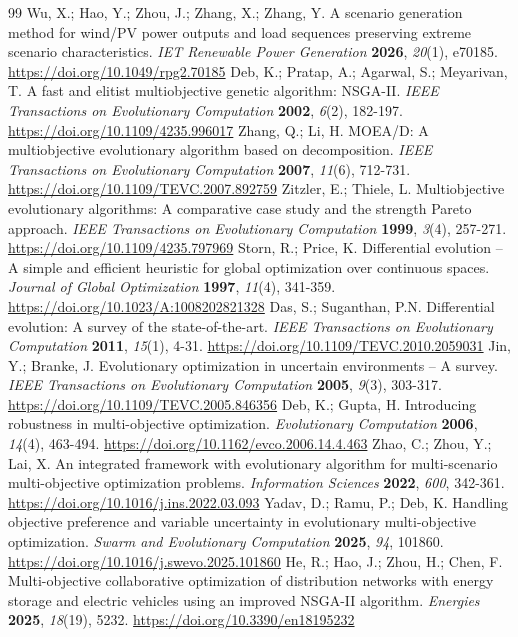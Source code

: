 \documentclass[energies,article,submit,moreauthors]{Definitions/mdpi}
\begin{document}
\begin{thebibliography}{99}
 Wu, X.; Hao, Y.; Zhou, J.; Zhang, X.; Zhang, Y. A scenario generation method for wind/PV power outputs and load sequences preserving extreme scenario characteristics. \emph{IET Renewable Power Generation} \textbf{2026}, \emph{20}(1), e70185. \url{https://doi.org/10.1049/rpg2.70185}
 Deb, K.; Pratap, A.; Agarwal, S.; Meyarivan, T. A fast and elitist multiobjective genetic algorithm: NSGA-II. \emph{IEEE Transactions on Evolutionary Computation} \textbf{2002}, \emph{6}(2), 182-197. \url{https://doi.org/10.1109/4235.996017}
 Zhang, Q.; Li, H. MOEA/D: A multiobjective evolutionary algorithm based on decomposition. \emph{IEEE Transactions on Evolutionary Computation} \textbf{2007}, \emph{11}(6), 712-731. \url{https://doi.org/10.1109/TEVC.2007.892759}
 Zitzler, E.; Thiele, L. Multiobjective evolutionary algorithms: A comparative case study and the strength Pareto approach. \emph{IEEE Transactions on Evolutionary Computation} \textbf{1999}, \emph{3}(4), 257-271. \url{https://doi.org/10.1109/4235.797969}
 Storn, R.; Price, K. Differential evolution -- A simple and efficient heuristic for global optimization over continuous spaces. \emph{Journal of Global Optimization} \textbf{1997}, \emph{11}(4), 341-359. \url{https://doi.org/10.1023/A:1008202821328}
 Das, S.; Suganthan, P.N. Differential evolution: A survey of the state-of-the-art. \emph{IEEE Transactions on Evolutionary Computation} \textbf{2011}, \emph{15}(1), 4-31. \url{https://doi.org/10.1109/TEVC.2010.2059031}
 Jin, Y.; Branke, J. Evolutionary optimization in uncertain environments -- A survey. \emph{IEEE Transactions on Evolutionary Computation} \textbf{2005}, \emph{9}(3), 303-317. \url{https://doi.org/10.1109/TEVC.2005.846356}
 Deb, K.; Gupta, H. Introducing robustness in multi-objective optimization. \emph{Evolutionary Computation} \textbf{2006}, \emph{14}(4), 463-494. \url{https://doi.org/10.1162/evco.2006.14.4.463}
 Zhao, C.; Zhou, Y.; Lai, X. An integrated framework with evolutionary algorithm for multi-scenario multi-objective optimization problems. \emph{Information Sciences} \textbf{2022}, \emph{600}, 342-361. \url{https://doi.org/10.1016/j.ins.2022.03.093}
 Yadav, D.; Ramu, P.; Deb, K. Handling objective preference and variable uncertainty in evolutionary multi-objective optimization. \emph{Swarm and Evolutionary Computation} \textbf{2025}, \emph{94}, 101860. \url{https://doi.org/10.1016/j.swevo.2025.101860}
 He, R.; Hao, J.; Zhou, H.; Chen, F. Multi-objective collaborative optimization of distribution networks with energy storage and electric vehicles using an improved NSGA-II algorithm. \emph{Energies} \textbf{2025}, \emph{18}(19), 5232. \url{https://doi.org/10.3390/en18195232}

\end{thebibliography}
\end{document}
